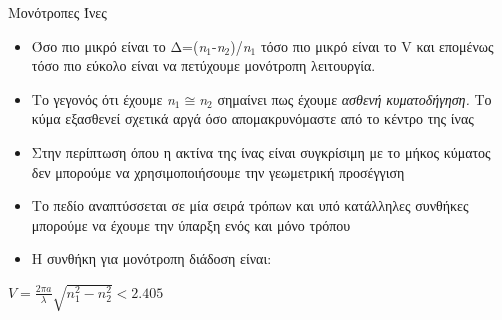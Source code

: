 \documentclass[11pt,aspectratio=169]{beamer}
\begin{document}
\begin{frame}[shrink=20,t]{Μονότροπες Ίνες}
\begin{itemize}
\item Όσο πιο μικρό είναι το Δ=(\textit{n}$_{\text{1}}$-\textit{n}$_{\text{2}}$)/\textit{n}$_{\text{1}}$ τόσο πιο μικρό είναι το V και επομένως τόσο πιο εύκολο είναι να πετύχουμε μονότροπη λειτουργία.
\item Το γεγονός ότι έχουμε \textit{n}$_{\text{1}}$\ensuremath{\cong}\textit{n}$_{\text{2}}$ σημαίνει πως έχουμε \textit{ασθενή }\textit{κυματοδήγηση}\textit{.} Το κύμα εξασθενεί σχετικά αργά όσο απομακρυνόμαστε από το κέντρο της ίνας
\end{itemize}
\medskip
\begin{itemize}
\item Στην περίπτωση όπου η ακτίνα της ίνας είναι συγκρίσιμη με το μήκος κύματος δεν μπορούμε να χρησιμοποιήσουμε την γεωμετρική προσέγγιση
\item Το πεδίο αναπτύσσεται σε μία σειρά τρόπων και υπό κατάλληλες συνθήκες μπορούμε να έχουμε την ύπαρξη ενός και μόνο τρόπου
\item Η συνθήκη για μονότροπη διάδοση είναι:
\end{itemize}
\begin{center}
$\displaystyle V=\frac{2\pi a}{\lambda}\sqrt{n_{1}^{2}-n_{2}^{2}}<2.405$\\[0.6ex]
\end{center}
\end{frame}
\end{document}
